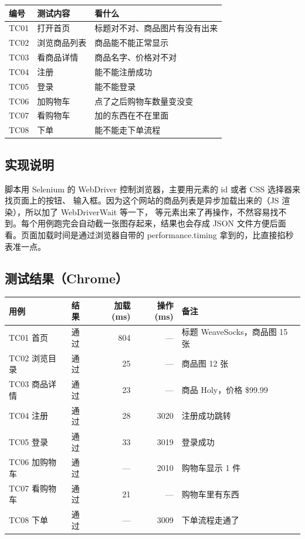 \documentclass[11pt,a4paper]{ctexart}
\begin{document}
\begin{table}[H]
\centering
\begin{tabularx}{\textwidth}{llX}
\toprule
\textbf{编号} & \textbf{测试内容} & \textbf{看什么} \\
\midrule
TC01 & 打开首页 & 标题对不对、商品图片有没有出来 \\
TC02 & 浏览商品列表 & 商品能不能正常显示 \\
TC03 & 看商品详情 & 商品名字、价格对不对 \\
TC04 & 注册 & 能不能注册成功 \\
TC05 & 登录 & 能不能登录 \\
TC06 & 加购物车 & 点了之后购物车数量变没变 \\
TC07 & 看购物车 & 加的东西在不在里面 \\
TC08 & 下单 & 能不能走下单流程 \\
\bottomrule
\end{tabularx}
\end{table}

\subsection{实现说明}

脚本用 Selenium 的 WebDriver 控制浏览器，主要用元素的 id 或者 CSS 选择器来找页面上的按钮、
输入框。因为这个网站的商品列表是异步加载出来的（JS 渲染），所以加了 WebDriverWait 等一下，
等元素出来了再操作，不然容易找不到。每个用例跑完会自动截一张图存起来，结果也会存成 JSON
文件方便后面看。页面加载时间是通过浏览器自带的 performance.timing 拿到的，比直接掐秒表准一点。

\subsection{测试结果（Chrome）}

\begin{table}[H]
\centering
\begin{tabularx}{\textwidth}{llrrX}
\toprule
\textbf{用例} & \textbf{结果} & \textbf{加载(ms)} & \textbf{操作(ms)} & \textbf{备注} \\
\midrule
TC01 首页 & 通过 & 804 & --- & 标题 WeaveSocks，商品图 15 张 \\
TC02 浏览目录 & 通过 & 25 & --- & 商品图 12 张 \\
TC03 商品详情 & 通过 & 23 & --- & 商品 Holy，价格 \$99.99 \\
TC04 注册 & 通过 & 28 & 3020 & 注册成功跳转 \\
TC05 登录 & 通过 & 33 & 3019 & 登录成功 \\
TC06 加购物车 & 通过 & --- & 2010 & 购物车显示 1 件 \\
TC07 看购物车 & 通过 & 21 & --- & 购物车里有东西 \\
TC08 下单 & 通过 & --- & 3009 & 下单流程走通了 \\
\bottomrule
\end{tabularx}
\end{table}
\end{document}
